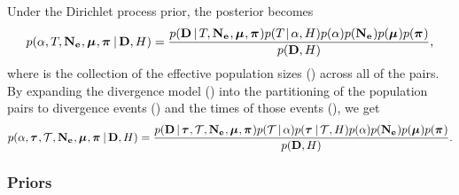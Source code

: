\begin{linenomath}
Under the Dirichlet process prior, the posterior becomes
\begin{equation}
    p(
    \alpha,
    T_{},
    \mathbf{N_{e}}_{},
    \boldsymbol{\mu}_{},
    \boldsymbol{\pi}_{}
    \,|\,
    \mathbf{D},
    H
    )
    =
    \frac{
        p(
        \mathbf{D}
        \,|\,
        T_{},
        \mathbf{N_{e}}_{},
        \boldsymbol{\mu}_{},
        \boldsymbol{\pi}_{}
        )
        p(T_{} \,|\, \alpha, H)
        p(\alpha)
        p(\mathbf{N_{e}}_{})
        p(\boldsymbol{\mu}_{})
        p(\boldsymbol{\pi}_{})
    }{
        p(
        \mathbf{D},
        H
        )
    },
    \label{eq:bayesrule}
\end{equation}
where
\collectionpopsizes
is the collection of the effective population sizes (\comparisonpopsizes{})
across all of the pairs.
By expanding the divergence model
(\divtimemodel)
into the partitioning of the population pairs to divergence events
(\divtimesets)
and the times of those events 
(\divtimes),
we get
\begin{equation}
    p(
    \alpha,
    \boldsymbol{\tau}_{},
    \mathcal{T},
    \mathbf{N_{e}}_{},
    \boldsymbol{\mu}_{},
    \boldsymbol{\pi}_{}
    \,|\,
    \mathbf{D},
    H
    )
    =
    \frac{
        p(
        \mathbf{D}
        \,|\,
        \boldsymbol{\tau}_{},
        \mathcal{T},
        \mathbf{N_{e}}_{},
        \boldsymbol{\mu}_{},
        \boldsymbol{\pi}_{}
        )
        p(\mathcal{T} \,|\, \alpha)
        p(\boldsymbol{\tau}_{} \,|\, \mathcal{T}, H)
        p(\alpha)
        p(\mathbf{N_{e}}_{})
        p(\boldsymbol{\mu}_{})
        p(\boldsymbol{\pi}_{})
    }{
        p(
        \mathbf{D},
        H
        )
    }.
    \label{eq:bayesruleexpanded}
\end{equation}
\end{linenomath}

\subsubsection{Priors}



